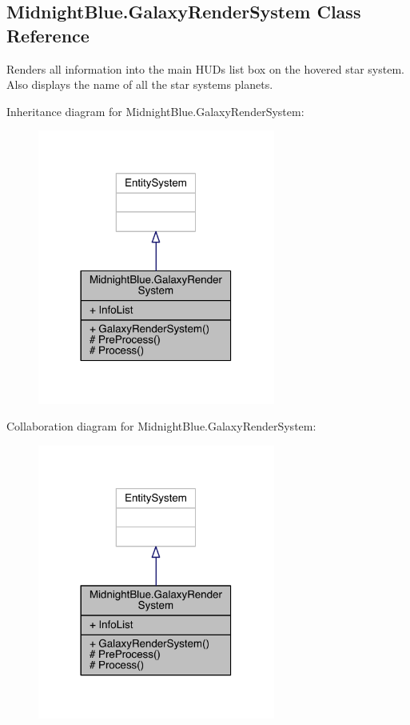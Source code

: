 \hypertarget{class_midnight_blue_1_1_galaxy_render_system}{}\subsection{Midnight\+Blue.\+Galaxy\+Render\+System Class Reference}
\label{class_midnight_blue_1_1_galaxy_render_system}


Renders all information into the main H\+UD\textquotesingle{}s list box on the hovered star system. Also displays the name of all the star systems planets.  




Inheritance diagram for Midnight\+Blue.\+Galaxy\+Render\+System\+:\nopagebreak
\begin{figure}[H]
\begin{center}
\leavevmode
\includegraphics[width=221pt]{class_midnight_blue_1_1_galaxy_render_system__inherit__graph}
\end{center}
\end{figure}


Collaboration diagram for Midnight\+Blue.\+Galaxy\+Render\+System\+:\nopagebreak
\begin{figure}[H]
\begin{center}
\leavevmode
\includegraphics[width=221pt]{class_midnight_blue_1_1_galaxy_render_system__coll__graph}
\end{center}
\end{figure}
